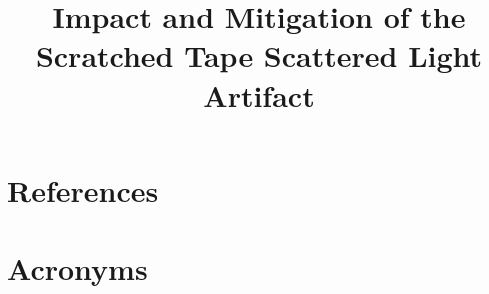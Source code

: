 \documentclass[SE,lsstdraft,authoryear,toc]{lsstdoc}
\title{Impact and Mitigation of the Scratched Tape Scattered Light Artifact}
\date{\vcsDate}
\begin{document}
\maketitle


\appendix
\section{References} \label{sec:bib}
\renewcommand{\refname}{} %


\section{Acronyms} \label{sec:acronyms}

\end{document}
